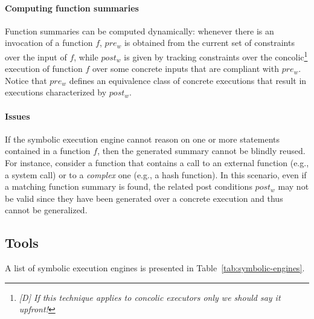 \paragraph{Computing function summaries} Function summaries can be computed dynamically: whenever there is an invocation of a function $f$, $pre_w$ is obtained from the current set of constraints over the input of $f$, while $post_w$ is given by tracking constraints over the concolic\footnote{{\em [D] If this technique applies to concolic executors only we should say it upfront!}} execution of function $f$ over some concrete inputs that are compliant with $pre_w$. Notice that $pre_w$ defines an equivalence class of concrete executions that result in executions characterized by $post_w$. 

\paragraph{Issues} If the symbolic execution engine cannot reason on one or more statements contained in a function $f$, then the generated summary cannot be blindly reused. For instance, consider a function that contains a call to an external function (e.g., a system call) or to a {\em complex} one (e.g., a hash function). In this scenario, even if a matching function summary is found, the related post conditions $post_w$ may not be valid since they have been generated over a concrete execution and thus cannot be generalized. %


\subsection{Tools}
A list of symbolic execution engines is presented in Table~\ref{tab:symbolic-engines}.


